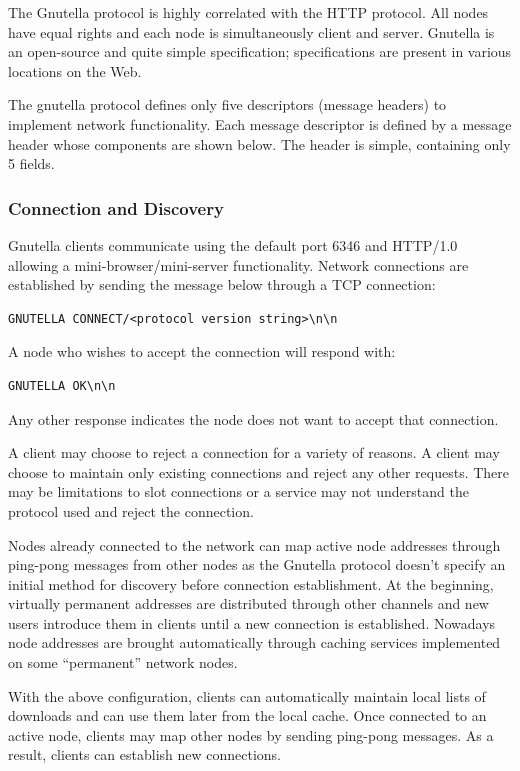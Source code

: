 The Gnutella protocol is highly correlated with the HTTP protocol. All nodes
have equal rights and each node is simultaneously client and server. Gnutella
is an open-source and quite simple specification; specifications are present
in various locations on the Web.

The gnutella protocol defines only five descriptors (message headers) to
implement network functionality. Each message descriptor is defined by a
message header whose components are shown below. The header is simple,
containing only 5 fields.

\subsubsection{Connection and Discovery}

Gnutella clients communicate using the default port 6346 and HTTP/1.0 allowing
a mini-browser/mini-server functionality. Network connections are established
by sending the message below through a TCP connection:

\begin{verbatim}
GNUTELLA CONNECT/<protocol version string>\n\n
\end{verbatim}

A node who wishes to accept the connection will respond with:
\begin{verbatim}
GNUTELLA OK\n\n
\end{verbatim}

Any other response indicates the node does not want to accept that connection.

A client may choose to reject a connection for a variety of reasons. A client
may choose to maintain only existing connections and reject any other
requests. There may be limitations to slot connections or a service may not
understand the protocol used and reject the connection.

Nodes already connected to the network can map active node addresses through
ping-pong messages from other nodes as the Gnutella protocol doesn't specify
an initial method for discovery before connection establishment. At the
beginning, virtually permanent addresses are distributed through other channels
and new users introduce them in clients until a new connection is established.
Nowadays node addresses are brought automatically through caching services
implemented on some ``permanent'' network nodes.

With the above configuration, clients can automatically maintain local lists
of downloads and can use them later from the local cache. Once connected to an
active node, clients may map other nodes by sending ping-pong messages. As a
result, clients can establish new connections.

